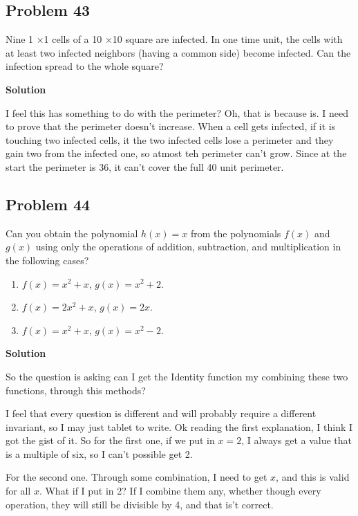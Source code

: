\documentclass[12pt,tikz,border=10pt]{article}
\theoremstyle{definition}
\theoremstyle{remark}
\begin{document}
\subsection{Problem 43}

Nine 1 ×1 cells of a 10 ×10 square are infected. In one time unit, the cells with
at least two infected neighbors (having a common side) become infected. Can the
infection spread to the whole square?


\textbf{Solution}

I feel this has something to do with the perimeter? Oh, that is because is. 
I need to prove that the perimeter doesn't increase. When a cell gets infected, if 
it is touching two infected cells, it the two infected cells lose a perimeter and they gain two from the
infected one, so atmost teh perimeter can't grow. Since at the start the perimeter is 36, it can't cover the full 40
unit perimeter.

\subsection{Problem 44}

Can you obtain the polynomial \( h(x) = x \) from the polynomials \( f(x) \) and \( g(x) \) using only the operations of addition, subtraction, and multiplication in the following cases?

\begin{enumerate}
    \item \( f(x) = x^2 + x \), \quad \( g(x) = x^2 + 2 \).
    \item \( f(x) = 2x^2 + x \), \quad \( g(x) = 2x \).
    \item \( f(x) = x^2 + x \), \quad \( g(x) = x^2 - 2 \).
\end{enumerate}

\textbf{Solution}

So the question is asking can I get the Identity function my combining these two functions, through this methods?

I feel that every question is different and will probably require a different invariant, so I may just tablet to write.
Ok reading the first explanation, I think I got the gist of it. So for the first one, if we put in $x=2$, I always get a value 
that is a multiple of six, so I can't possible get 2. 

For the second one. Through some combination, I need to get $x$, and this is valid for all $x$. What if I put in 2? If I combine them any, 
whether though every operation, they will still be divisible by 4, and that is't correct.
\end{document}
